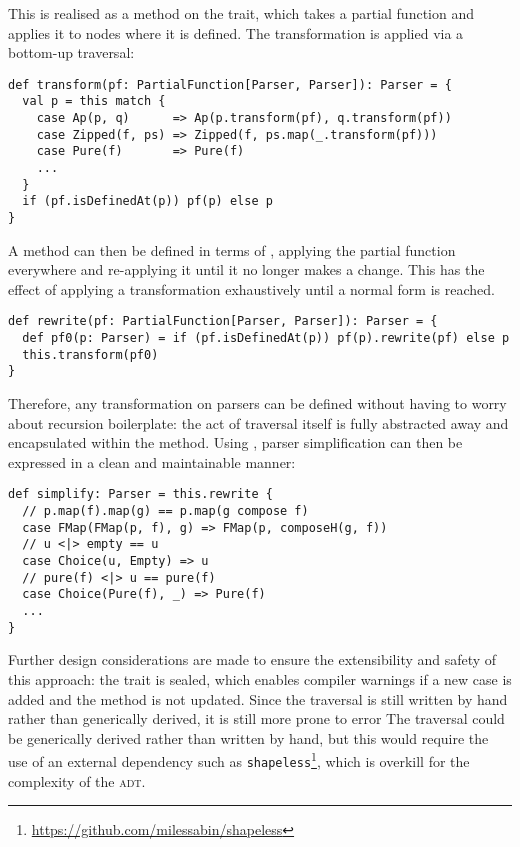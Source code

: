 \documentclass[../../main.tex]{subfiles}
\begin{document}
This is realised as a  method on the  trait, which takes a partial function and applies it to nodes where it is defined.
The transformation is applied via a bottom-up traversal:
\begin{verbatim}
def transform(pf: PartialFunction[Parser, Parser]): Parser = {
  val p = this match {
    case Ap(p, q)      => Ap(p.transform(pf), q.transform(pf))
    case Zipped(f, ps) => Zipped(f, ps.map(_.transform(pf)))
    case Pure(f)       => Pure(f)
    ...
  }
  if (pf.isDefinedAt(p)) pf(p) else p
}
\end{verbatim}
%
A  method can then be defined in terms of , applying the partial function everywhere and re-applying it until it no longer makes a change.
This has the effect of applying a transformation exhaustively until a normal form is reached.
\begin{verbatim}
def rewrite(pf: PartialFunction[Parser, Parser]): Parser = {
  def pf0(p: Parser) = if (pf.isDefinedAt(p)) pf(p).rewrite(pf) else p
  this.transform(pf0)
}
\end{verbatim}
%
Therefore, any transformation on parsers can be defined without having to worry about recursion boilerplate: the act of traversal itself is fully abstracted away and encapsulated within the  method.
Using , parser simplification can then be expressed in a clean and maintainable manner:
\begin{verbatim}
def simplify: Parser = this.rewrite {
  // p.map(f).map(g) == p.map(g compose f)
  case FMap(FMap(p, f), g) => FMap(p, composeH(g, f))
  // u <|> empty == u
  case Choice(u, Empty) => u
  // pure(f) <|> u == pure(f)
  case Choice(Pure(f), _) => Pure(f)
  ...
}
\end{verbatim}
%
Further design considerations are made to ensure the extensibility and safety of this approach: the  trait is sealed, which enables compiler warnings if a new  case is added and the  method is not updated.
Since the traversal is still written by hand rather than generically derived, it is still more prone to error
The traversal could be generically derived rather than written by hand, but this would require the use of an external dependency such as \texttt{shapeless}\footnote{\url{https://github.com/milessabin/shapeless}},
which is overkill for the complexity of the  \textsc{adt}.
\end{document}
